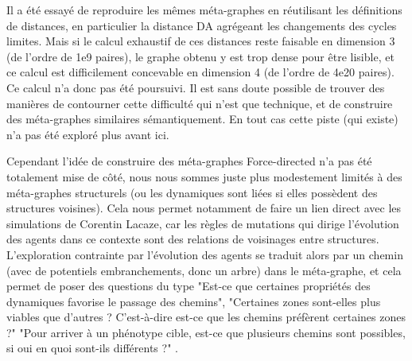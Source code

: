 \documentclass[12pt, a4paper]{article}
\begin{document}
Il a été essayé de reproduire les mêmes méta-graphes en réutilisant les définitions de distances, en particulier la distance DA agrégeant les changements des cycles limites. Mais si le calcul exhaustif de ces distances reste faisable en dimension 3 (de l'ordre de 1e9 paires), le graphe obtenu y est trop dense pour être lisible, et ce calcul est difficilement concevable en dimension 4 (de l'ordre de 4e20 paires).
Ce calcul n'a donc pas été poursuivi.
Il est sans doute possible de trouver des manières de contourner cette difficulté qui n'est que technique, et de construire des méta-graphes similaires sémantiquement. En tout cas cette piste (qui existe) n'a pas été exploré plus avant ici.

Cependant l'idée de construire des méta-graphes Force-directed n'a pas été totalement mise de côté, nous nous sommes juste plus modestement limités à des méta-graphes structurels (ou les dynamiques sont liées si elles possèdent des structures voisines). Cela nous permet notamment de faire un lien direct avec les simulations de Corentin Lacaze, car les règles de mutations qui dirige l'évolution des agents dans ce contexte sont des relations de voisinages entre structures. L'exploration contrainte par l'évolution des agents se traduit alors par un chemin (avec de potentiels embranchements, donc un arbre) dans le méta-graphe, et cela permet de poser des questions du type "Est-ce que certaines propriétés des dynamiques favorise le passage des chemins", "Certaines zones sont-elles plus viables que d'autres ? C'est-à-dire est-ce que les chemins préfèrent certaines zones ?" "Pour arriver à un phénotype cible, est-ce que plusieurs chemins sont possibles, si oui en quoi sont-ils différents ?" .
\end{document}
